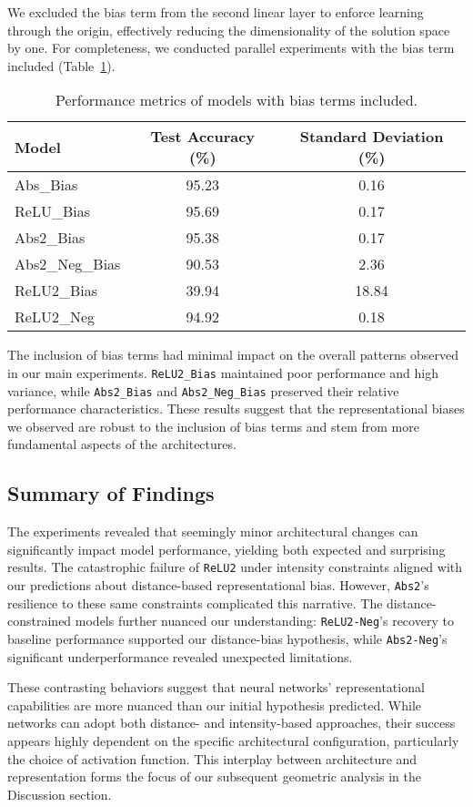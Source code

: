 We excluded the bias term from the second linear layer to enforce learning through the origin, effectively reducing the dimensionality of the solution space by one. For completeness, we conducted parallel experiments with the bias term included (Table~\ref{tab:biased_performance}).

\begin{table}[H]
    \centering
    \begin{tabular}{lcc}
        \toprule
        \textbf{Model} & \textbf{Test Accuracy (\%)} & \textbf{Standard Deviation (\%)} \\
        \midrule
        Abs\_Bias & 95.23 & 0.16 \\
        ReLU\_Bias & 95.69 & 0.17 \\
        \midrule
        Abs2\_Bias & 95.38 & 0.17 \\
        Abs2\_Neg\_Bias & 90.53 & 2.36 \\
        ReLU2\_Bias & 39.94 & 18.84 \\
        ReLU2\_Neg & 94.92 & 0.18 \\
        \bottomrule
    \end{tabular}
    \caption{Performance metrics of models with bias terms included.}
    \label{tab:biased_performance}
\end{table}

The inclusion of bias terms had minimal impact on the overall patterns observed in our main experiments. \texttt{ReLU2\_Bias} maintained poor performance and high variance, while \texttt{Abs2\_Bias} and \texttt{Abs2\_Neg\_Bias} preserved their relative performance characteristics. These results suggest that the representational biases we observed are robust to the inclusion of bias terms and stem from more fundamental aspects of the architectures.

\subsection{Summary of Findings}

The experiments revealed that seemingly minor architectural changes can significantly impact model performance, yielding both expected and surprising results. The catastrophic failure of \texttt{ReLU2} under intensity constraints aligned with our predictions about distance-based representational bias. However, \texttt{Abs2}'s resilience to these same constraints complicated this narrative. The distance-constrained models further nuanced our understanding: \texttt{ReLU2-Neg}'s recovery to baseline performance supported our distance-bias hypothesis, while \texttt{Abs2-Neg}'s significant underperformance revealed unexpected limitations.

These contrasting behaviors suggest that neural networks' representational capabilities are more nuanced than our initial hypothesis predicted. While networks can adopt both distance- and intensity-based approaches, their success appears highly dependent on the specific architectural configuration, particularly the choice of activation function. This interplay between architecture and representation forms the focus of our subsequent geometric analysis in the Discussion section.
